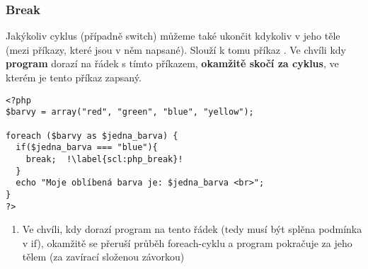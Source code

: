 \subsubsection{Break}
Jakýkoliv cyklus (případně switch) můžeme také ukončit kdykoliv v jeho těle (mezi příkazy, které jsou v něm napsané). Slouží k tomu příkaz \textbf{}. Ve chvíli kdy \textbf{program} dorazí na řádek s tímto příkazem, \textbf{okamžitě skočí za cyklus}, ve kterém je tento příkaz zapsaný.\\
\begin{minipage}[t]{.45\textwidth}
\begin{code}
\begin{verbatim}
<?php
$barvy = array("red", "green", "blue", "yellow");

foreach ($barvy as $jedna_barva) {
  if($jedna_barva === "blue"){
    break;  !\label{scl:php_break}!
  }
  echo "Moje oblíbená barva je: $jedna_barva <br>";
}
?> 
\end{verbatim}

\label{code:php_break}
\end{code}
\end{minipage}
\begin{minipage}[t]{.45\textwidth}
\begin{enumerate}
\vspace{3.2cm}
\item[ř. \ref{scl:php_break}:] Ve chvíli, kdy dorazí program na tento řádek (tedy musí být splěna podmínka v if), okamžitě se přeruší průběh foreach-cyklu a program pokračuje za jeho tělem (za zavírací složenou závorkou)
\end{enumerate}
\end{minipage}\\

